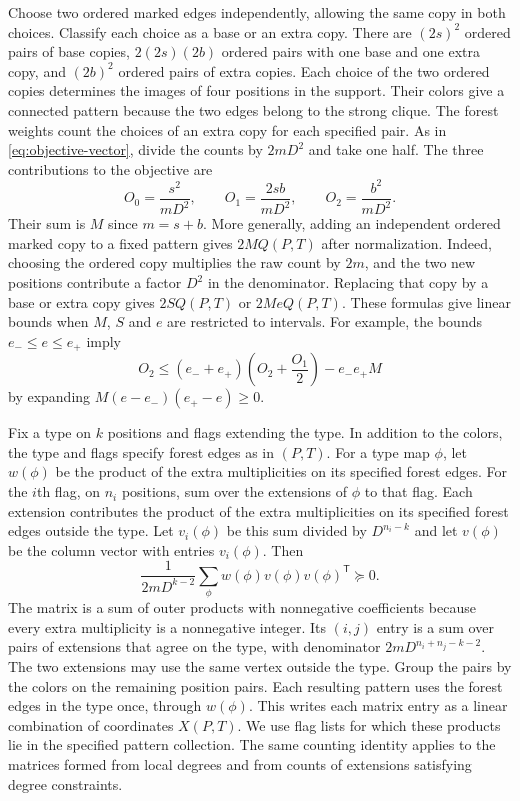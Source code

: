 Choose two ordered marked edges independently, allowing the same
copy in both choices. Classify each choice as a base or an extra
copy. There are $(2s)^2$ ordered pairs of base copies,
$2(2s)(2b)$ ordered pairs with one base and one extra copy, and
$(2b)^2$ ordered pairs of extra copies. Each choice of the two
ordered copies determines the images of four positions in the
support. Their colors give a connected pattern because the two
edges belong to the strong clique. The forest weights count the
choices of an extra copy for each specified pair. As in
\eqref{eq:objective-vector}, divide the counts by $2mD^2$ and take
one half. The three contributions to the objective are
\[
 O_0=\frac{s^2}{mD^2},\qquad
 O_1=\frac{2sb}{mD^2},\qquad
 O_2=\frac{b^2}{mD^2}.
\]
Their sum is $M$ since $m=s+b$. More generally, adding an independent
ordered marked copy to a fixed pattern gives $2M Q(P,T)$
after normalization. Indeed, choosing the ordered copy multiplies the raw count by
$2m$, and the two new positions contribute a factor $D^2$ in the denominator. Replacing that copy by a base
or extra copy gives $2S Q(P,T)$ or $2Me Q(P,T)$. These formulas
give linear bounds when $M$, $S$ and $e$ are restricted to intervals.
For example, the bounds $e_-\le e\le e_+$ imply
\[
 O_2\le(e_-+e_+)\left(O_2+\frac{O_1}{2}\right)-e_-e_+M
\]
by expanding $M(e-e_-)(e_+-e)\ge0$.

Fix a type on $k$ positions and flags extending the type. In addition
to the colors, the type and flags specify forest edges as in $(P,T)$.
For a type map $\phi$, let $w(\phi)$ be the product of the extra
multiplicities on its specified forest edges. For the $i$th flag, on
$n_i$ positions, sum over the extensions of $\phi$ to that flag. Each
extension contributes the product of the extra multiplicities on its
specified forest edges outside the type. Let $v_i(\phi)$ be this sum
divided by $D^{n_i-k}$ and let $v(\phi)$ be the column vector with
entries $v_i(\phi)$. Then
\[
 \frac{1}{2mD^{k-2}}\sum_\phi w(\phi)v(\phi)v(\phi)^{\mathsf T}\succeq0.
\]
The matrix is a sum of outer products with nonnegative coefficients
because every extra multiplicity is a nonnegative integer. Its $(i,j)$ entry is a sum over pairs of extensions that agree on the type,
with denominator $2mD^{n_i+n_j-k-2}$. The two extensions may use the
same vertex outside the type. Group the pairs by the colors on the
remaining position pairs. Each resulting pattern uses the forest
edges in the type once, through $w(\phi)$. This writes each matrix
entry as a linear combination of coordinates $X(P,T)$. We use flag
lists for which these products lie in the specified pattern collection.
The same counting identity applies to the matrices formed from local
degrees and from counts of extensions satisfying degree constraints.

